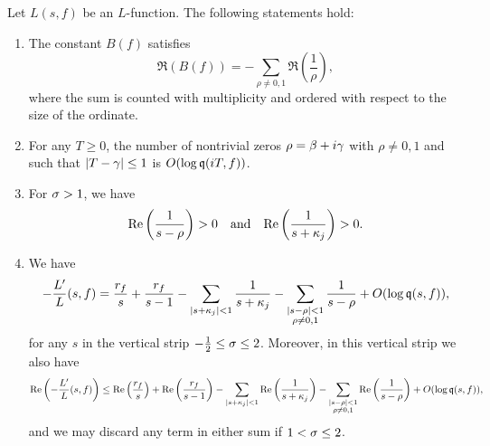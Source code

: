     \begin{lemma}\label{lem:powerful_L-function_approximation_lemma}
      Let $L(s,f)$ be an $L$-function. The following statements hold:
      \begin{enumerate}[label*=(\roman*)]
        \item The constant $B(f)$ satisfies
        \[
          \Re(B(f)) = -\sum_{\rho \neq 0,1}\Re\left(\frac{1}{\rho}\right),
        \]
        where the sum is counted with multiplicity and ordered with respect to the size of the ordinate.
        \item For any $T \ge 0$, the number of nontrivial zeros $\rho = \beta+i\gamma$ with $\rho \neq 0,1$ and such that $|T-\gamma| \le 1$ is $O(\log{\mathfrak{q}(iT,f)})$.
        \item For $\sigma > 1$, we have
        \[
          \mathrm{Re}\left(\frac{1}{s-\rho}\right) > 0 \quad \text{and} \quad \mathrm{Re}\left(\frac{1}{s+\kappa_{j}}\right) > 0.
        \]
        \item We have
        \[
          -\frac{L'}{L}(s,f) = \frac{r_{f}}{s}+\frac{r_{f}}{s-1}-\sum_{|s+\kappa_{j}| < 1}\frac{1}{s+\kappa_{j}}-\sum_{\substack{|s-\rho| < 1 \\ \rho \neq 0,1}}\frac{1}{s-\rho}+O(\log{\mathfrak{q}(s,f)}),
        \]
        for any $s$ in the vertical strip $-\frac{1}{2} \le \sigma \le 2$. Moreover, in this vertical strip we also have
        \[
          \mathrm{Re}\left(-\frac{L'}{L}(s,f)\right) \le \mathrm{Re}\left(\frac{r_{f}}{s}\right)+\mathrm{Re}\left(\frac{r_{f}}{s-1}\right)-\sum_{|s+\kappa_{j}| < 1}\mathrm{Re}\left(\frac{1}{s+\kappa_{j}}\right)-\sum_{\substack{|s-\rho| < 1 \\ \rho \neq 0,1}}\mathrm{Re}\left(\frac{1}{s-\rho}\right)+O(\log{\mathfrak{q}(s,f)}),
        \]
        and we may discard any term in either sum if $1 < \sigma \le 2$.
      \end{enumerate}
    \end{lemma}

